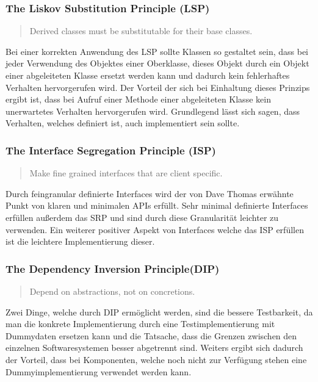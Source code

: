 \subsubsection{The Liskov Substitution Principle (LSP)}
\begin{quotation}
	Derived classes must be substitutable for their base classes.
\end{quotation}

Bei einer korrekten Anwendung des LSP sollte Klassen so gestaltet sein, dass bei jeder Verwendung des Objektes einer Oberklasse, dieses Objekt durch ein Objekt einer abgeleiteten Klasse ersetzt werden kann und dadurch kein fehlerhaftes Verhalten hervorgerufen wird. Der Vorteil der sich bei Einhaltung dieses Prinzips ergibt ist, dass bei Aufruf einer Methode einer abgeleiteten Klasse kein unerwartetes Verhalten hervorgerufen wird. Grundlegend lässt sich sagen, dass Verhalten, welches definiert ist, auch implementiert sein sollte.  

\subsubsection{The Interface Segregation Principle (ISP)}
\begin{quotation}
	Make fine grained interfaces that are client specific.
\end{quotation}

Durch feingranular definierte Interfaces wird der von Dave Thomas erwähnte Punkt von klaren und minimalen APIs erfüllt. Sehr minimal definierte Interfaces erfüllen außerdem das SRP und sind durch diese Granularität leichter zu verwenden. Ein weiterer positiver Aspekt von Interfaces welche das ISP erfüllen ist die leichtere Implementierung dieser.

\subsubsection{The Dependency Inversion Principle(DIP)}
\begin{quotation}
	Depend on abstractions, not on concretions.
\end{quotation}

Zwei Dinge, welche durch DIP ermöglicht werden, sind die bessere Testbarkeit, da man die konkrete Implementierung durch eine Testimplementierung mit Dummydaten ersetzen kann und die Tatsache, dass die Grenzen zwischen den einzelnen Softwaresystemen besser abgetrennt sind. Weiters ergibt sich dadurch der Vorteil, dass bei Komponenten, welche noch nicht zur Verfügung stehen eine Dummyimplementierung verwendet werden kann. 